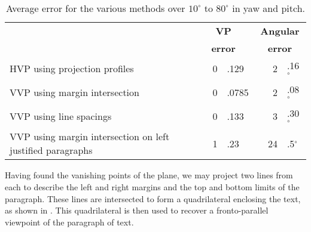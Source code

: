 \begin{table}[t]
  \begin{center}
    \begin{tabular}{|p{1.8in}|r@{}l|r@{}l|}
      \hline
      {\bf } & \multicolumn{2}{c|}{\bf VP} & \multicolumn{2}{c|}{\bf Angular} \\
      {\bf } & \multicolumn{2}{c|}{\bf error} & \multicolumn{2}{c|}{\bf error} \\
      \hline \hline
      HVP using projection profiles & ~~~0&.129 & ~~~2&.16$^\circ$ \\
      \hline
      VVP using margin intersection & 0&.0785 & 2&.08$^\circ$ \\
      \hline
      VVP using line spacings & 0&.133 & 3&.30$^\circ$ \\
      \hline
      VVP using margin intersection on left justified paragraphs & 1&.23 & 24&.5$^\circ$ \\
      \hline
    \end{tabular}
  \end{center}
  \caption{Average error for the various methods over $10^\circ$ to $80^{\circ}$ in yaw and pitch.}
  \label{accuracytable}
\end{table}














Having found the vanishing points of the plane, we may project two lines from each
to describe the left and right margins and the top and bottom limits of the paragraph.
These lines are intersected to form a quadrilateral enclosing the text,
as shown in . %
This quadrilateral is then used to recover a fronto-parallel viewpoint
of the paragraph of text.


